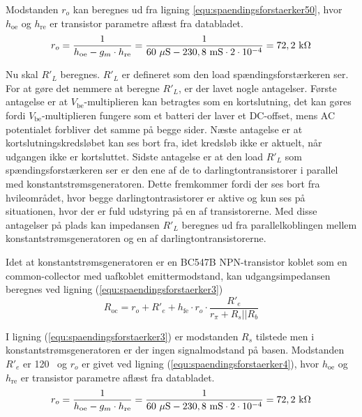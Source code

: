 Modstanden $r_o$ kan beregnes ud fra ligning \ref{equ:spaendingsforstaerker50},  hvor $h_{\mathrm{oe}}$ og $h_{\mathrm{re}}$ er transistor parametre aflæst fra databladet.
\begin{equation}
\label{equ:spaendingsforstaerker50}
r_o = \frac{1}{h_{\mathrm{oe}} - g_m \cdot h_{\mathrm{re}}} = \frac{1}{60~\mathrm{\mu S} - 230,8~\mathrm{mS} \cdot 2 \cdot 10^{-4}} = 72,2~\mathrm{k}\ohm
\end{equation}

Nu skal $R'_L$ beregnes. $R'_L$ er defineret som den load spændingsforstærkeren ser. For at gøre det nemmere at beregne $R'_L$, er der lavet nogle antagelser. Første antagelse er at $V_\mathrm{be}$-multiplieren kan betragtes som en kortslutning, det kan gøres fordi $V_\mathrm{be}$-multiplieren fungere som et batteri der laver et DC-offset, mens AC potentialet  forbliver det samme på begge sider. Næste antagelse er at kortslutningskredsløbet kan ses bort fra, idet kredsløb ikke er aktuelt, når udgangen ikke er kortsluttet. Sidste antagelse er at den load $R'_L$ som spændingsforstærkeren ser er den ene af de to darlingtontransistorer i parallel med konstantstrømsgeneratoren. Dette fremkommer fordi der ses bort fra hvileområdet, hvor begge darlingtontrasistorer er aktive og kun ses på situationen, hvor der er fuld udstyring på en af transistorerne.
Med disse antagelser på plads kan impedansen $R'_L$ beregnes ud fra parallelkoblingen mellem konstantstrømsgeneratoren og en af darlingtontransistorerne.

Idet at konstantstrømsgeneratoren er en BC547B NPN-transistor koblet som en common-collector med uafkoblet emittermodstand, kan udgangsimpedansen beregnes ved ligning (\ref{equ:spaendingsforstaerker3})
\begin{equation}
\label{equ:spaendingsforstaerker3}
R_{\mathrm{oc}} = r_o + R'_e + h_{\mathrm{fe}} \cdot r_o \cdot \frac{R'_e}{r_{\pi} + R_s || R_b}
\end{equation}

I ligning (\ref{equ:spaendingsforstaerker3}) er modstanden $R_s$ tilstede men i konstantstrømsgeneratoren er der ingen signalmodstand på basen. Modstanden $R'_e$ er 120 \ohm~og $r_o$ er givet ved ligning (\ref{equ:spaendingsforstaerker4}), hvor $h_{\mathrm{oe}}$ og $h_{\mathrm{re}}$ er transistor parametre aflæst fra databladet.
\begin{equation}
\label{equ:spaendingsforstaerker4}
r_o = \frac{1}{h_{\mathrm{oe}} - g_m \cdot h_{\mathrm{re}}} = \frac{1}{60~\mathrm{\mu S} - 230,8~\mathrm{mS} \cdot 2 \cdot 10^{-4}} = 72,2~\mathrm{k}\ohm
\end{equation}


